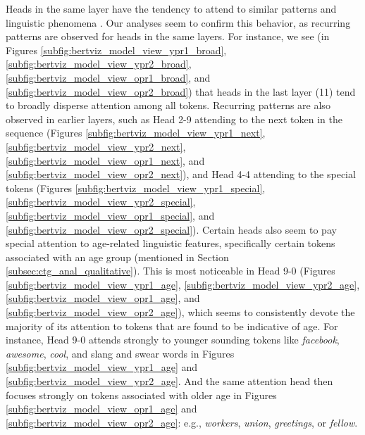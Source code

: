 Heads in the same layer have the tendency to attend to similar patterns and linguistic phenomena \cite{clark-etal-2019-bert}. Our analyses seem to confirm this behavior, as recurring patterns are observed for heads in the same layers. For instance, we see (in Figures \ref{subfig:bertviz_model_view_ypr1_broad}, \ref{subfig:bertviz_model_view_ypr2_broad}, \ref{subfig:bertviz_model_view_opr1_broad}, and \ref{subfig:bertviz_model_view_opr2_broad}) that heads in the last layer (11) tend to broadly disperse attention among all tokens. Recurring patterns are also observed in earlier layers, such as Head 2-9 attending to the next token in the sequence (Figures \ref{subfig:bertviz_model_view_ypr1_next}, \ref{subfig:bertviz_model_view_ypr2_next}, \ref{subfig:bertviz_model_view_opr1_next}, and \ref{subfig:bertviz_model_view_opr2_next}), and Head 4-4 attending to the special tokens (Figures \ref{subfig:bertviz_model_view_ypr1_special}, \ref{subfig:bertviz_model_view_ypr2_special}, \ref{subfig:bertviz_model_view_opr1_special}, and \ref{subfig:bertviz_model_view_opr2_special}). Certain heads also seem to pay special attention to age-related linguistic features, specifically certain tokens associated with an age group (mentioned in Section \ref{subsec:ctg_anal_qualitative}). This is most noticeable in Head 9-0 (Figures \ref{subfig:bertviz_model_view_ypr1_age}, \ref{subfig:bertviz_model_view_ypr2_age}, \ref{subfig:bertviz_model_view_opr1_age}, and \ref{subfig:bertviz_model_view_opr2_age}), which seems to consistently devote the majority of its attention to tokens that are found to be indicative of age. For instance, Head 9-0 attends strongly to younger sounding tokens like \textit{facebook}, \textit{awesome}, \textit{cool}, and slang and swear words in Figures \ref{subfig:bertviz_model_view_ypr1_age} and \ref{subfig:bertviz_model_view_ypr2_age}. And the same attention head then focuses strongly on tokens associated with older age in Figures \ref{subfig:bertviz_model_view_opr1_age} and \ref{subfig:bertviz_model_view_opr2_age}: e.g., \textit{workers}, \textit{union}, \textit{greetings}, or \textit{fellow}.




